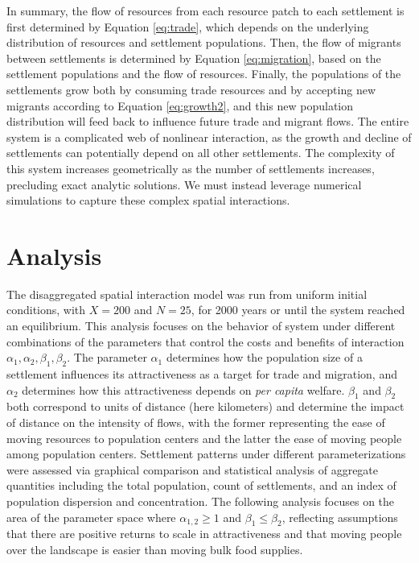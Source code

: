 \documentclass{article}
\begin{document}
In summary, the flow of resources from each resource patch to each settlement is first determined by Equation \ref{eq:trade}, which depends on the underlying distribution of resources and settlement populations. Then, the flow of migrants between settlements is determined by Equation \ref{eq:migration}, based on the settlement populations and the flow of resources. Finally, the populations of the settlements grow both by consuming trade resources and by accepting new migrants according to Equation \ref{eq:growth2}, and this new population distribution will feed back to influence future trade and migrant flows. The entire system is a complicated web of nonlinear interaction, as the growth and decline of settlements can potentially depend on all other settlements. The complexity of this system increases geometrically as the number of settlements increases, precluding exact analytic solutions. We must instead leverage numerical simulations to capture these complex spatial interactions.

\section{Analysis}

The disaggregated spatial interaction model was run from uniform initial conditions, with $X = 200$ and $N = 25$, for 2000 years or until the system reached an equilibrium. This analysis focuses on the behavior of system under different combinations of the parameters that control the costs and benefits of interaction $\alpha_1, \alpha_2, \beta_1, \beta_2$. The parameter $\alpha_1$ determines how the population size of a settlement influences its attractiveness as a target for trade and migration, and $\alpha_2$ determines how this attractiveness depends on \emph{per capita} welfare. $\beta_1$ and $\beta_2$ both correspond to units of distance (here kilometers) and determine the impact of distance on the intensity of flows, with the former representing the ease of moving resources to population centers and the latter the ease of moving people among population centers. Settlement patterns under different parameterizations were assessed via graphical comparison and statistical analysis of aggregate quantities including the total population, count of settlements, and an index of population dispersion and concentration. The following analysis focuses on the area of the parameter space where $\alpha_{1,2} \geq 1$ and $\beta_1 \leq \beta_2$, reflecting assumptions that there are positive returns to scale in attractiveness and that moving people over the landscape is easier than moving bulk food supplies. 
\end{document}
